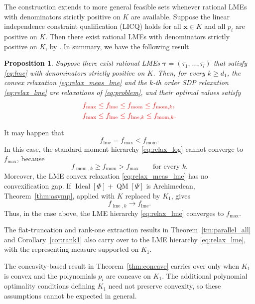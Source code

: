 \documentclass[pdflatex,sn-mathphys-num]{sn-jnl}%
\newcommand{\rd}[1]{{\color{red}#1}}
\newcommand{\vect}[1]{\boldsymbol{#1}}
\theoremstyle{thmstyleone}%
\newtheorem{proposition}[theorem]{Proposition}%
\theoremstyle{thmstyletwo}%
\theoremstyle{thmstylethree}%
\begin{document}
\rd{The construction extends to more general feasible sets whenever
rational LMEs with denominators strictly positive on $K$ are
available.}
Suppose the linear independence constraint qualification (LICQ)
holds for all $\vect{x}\in K$ and all $p_i$ are positive on $K$.
Then there exist rational LMEs with denominators strictly positive on $K$, 
by \cite[Proposition~3.6]{nie2023convex}. 
In summary, we have the following result.
\begin{proposition}\label{prop:rel}
	Suppose there exist rational LMEs $\vect{\tau} = (\tau_1,\ldots, \tau_l)$ that
	satisfy \eqref{eq:lme} with denominators strictly positive on $K$.
	\rd{Then, for every $k\geq d_1$, the convex relaxation
	\eqref{eq:relax_meas_lme} and the $k$-th order SDP relaxation
	\eqref{eq:relax_lme} are relaxations of \eqref{eq:problem}, and their
	optimal values satisfy}
	\[
	\rd{\begin{aligned}
		f_{\max}
		&\leq f_{\operatorname{lme}}
		\leq f_{\operatorname{mom}}
		\leq f_{\operatorname{mom},k},\\
		f_{\max}
		&\leq f_{\operatorname{lme}}
		\leq f_{\operatorname{lme},k}
		\leq f_{\operatorname{mom},k}.
	\end{aligned}}
	\]
\end{proposition}
\rd{It may happen that
\[
f_{\operatorname{lme}}=f_{\max}<f_{\operatorname{mom}}.
\]
\rd{In this case, the standard moment hierarchy
\eqref{eq:relax_log} cannot converge to $f_{\max}$,}
because
\[
f_{\operatorname{mom},k}
\geq f_{\operatorname{mom}}
>f_{\max}
\qquad\text{for every }k.
\]
\rd{Moreover, the LME convex relaxation}
\eqref{eq:relax_meas_lme} has no convexification gap.
If
$\operatorname{Ideal}[\Phi]+\operatorname{QM}[\Psi]$
is Archimedean, Theorem~\ref{thm:asymp}, applied with $K$ replaced
by $K_1$, gives
\[
f_{\operatorname{lme},k}
\longrightarrow f_{\operatorname{lme}}.
\]
Thus, in the case above, the LME hierarchy
\eqref{eq:relax_lme} converges to $f_{\max}$.
}

\rd{The flat-truncation and rank-one extraction results in
Theorem~\ref{tm:parallel_all} and Corollary~\ref{cor:rank1} also carry
over to the LME hierarchy \eqref{eq:relax_lme}, with the representing
measure supported on $K_1$.}

\rd{The concavity-based result in
Theorem~\ref{thm:concave} carries over only when $K_1$ is convex and
the polynomials $p_i$ are concave on $K_1$. The additional
polynomial optimality conditions defining $K_1$ need not preserve
convexity, so these assumptions cannot be expected in general.}
\end{document}
